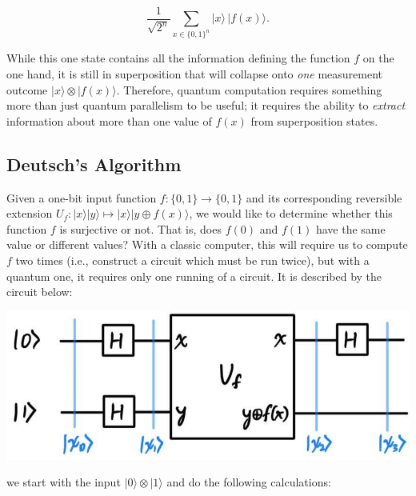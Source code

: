 \documentclass{article}
\theoremstyle{definition}
\begin{document}
        \[\frac{1}{\sqrt{2^n}} \sum_{x \in \{0, 1\}^n} |x\rangle \, |f(x)\rangle.\]

      While this one state contains all the information defining the function $f$ on the one hand, it is still in superposition that will collapse onto \textit{one} measurement outcome $|x \rangle \otimes |f(x) \rangle$. Therefore, quantum computation requires something more than just quantum parallelism to be useful; it requires the ability to \textit{extract} information about more than one value of $f(x)$ from superposition states.

  \subsection{Deutsch's Algorithm}

    Given a one-bit input function $f: \{0, 1\} \longrightarrow \{0, 1\}$ and its corresponding reversible extension $U_f: |x\rangle |y\rangle \mapsto |x \rangle |y \oplus f(x)\rangle$, we would like to determine whether this function $f$ is surjective or not. That is, does $f(0)$ and $f(1)$ have the same value or different values? With a classic computer, this will require us to compute $f$ two times (i.e., construct a circuit which must be run twice), but with a quantum one, it requires only one running of a circuit. It is described by the circuit below:

    \begin{center}
      \includegraphics[scale=0.3]{img/Deutsch_Algo.jpg}
    \end{center}

    we start with the input $|0 \rangle \otimes |1\rangle$ and do the following calculations:
\end{document}
